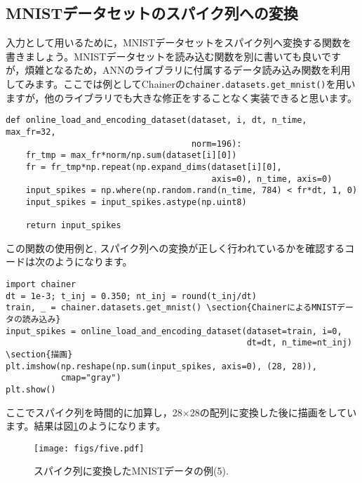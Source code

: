 \subsection{MNISTデータセットのスパイク列への変換}
入力として用いるために，MNISTデータセットをスパイク列へ変換する関数を書きましょう。MNISTデータセットを読み込む関数を別に書いても良いですが，煩雑となるため，ANNのライブラリに付属するデータ読み込み関数を利用してみます。ここでは例としてChainerの\texttt{chainer.datasets.get\_mnist()}を用いますが，他のライブラリでも大きな修正をすることなく実装できると思います。
\begin{verbatim}
def online_load_and_encoding_dataset(dataset, i, dt, n_time, max_fr=32,
                                     norm=196):
    fr_tmp = max_fr*norm/np.sum(dataset[i][0])
    fr = fr_tmp*np.repeat(np.expand_dims(dataset[i][0],
                                         axis=0), n_time, axis=0)
    input_spikes = np.where(np.random.rand(n_time, 784) < fr*dt, 1, 0)
    input_spikes = input_spikes.astype(np.uint8)

    return input_spikes
\end{verbatim}
この関数の使用例と, スパイク列への変換が正しく行われているかを確認するコードは次のようになります。
\begin{verbatim}
import chainer
dt = 1e-3; t_inj = 0.350; nt_inj = round(t_inj/dt)
train, _ = chainer.datasets.get_mnist() \section{ChainerによるMNISTデータの読み込み}
input_spikes = online_load_and_encoding_dataset(dataset=train, i=0,
                                                dt=dt, n_time=nt_inj)
\section{描画}
plt.imshow(np.reshape(np.sum(input_spikes, axis=0), (28, 28)),
           cmap="gray")
plt.show()
\end{verbatim}
ここでスパイク列を時間的に加算し，28$\times$28の配列に変換した後に描画をしています。結果は図\ref{fig:jitteredMNIST}のようになります。
\begin{figure}[htbp]
    \centering
    \texttt{[image: figs/five.pdf]}
    \caption{スパイク列に変換したMNISTデータの例(5).}
    \label{fig:jitteredMNIST}
\end{figure}

